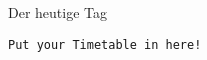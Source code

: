 \begin{frame}{Der heutige Tag}



 
     
\texttt{Put your Timetable in here!}\\ \, 
\end{frame}
    